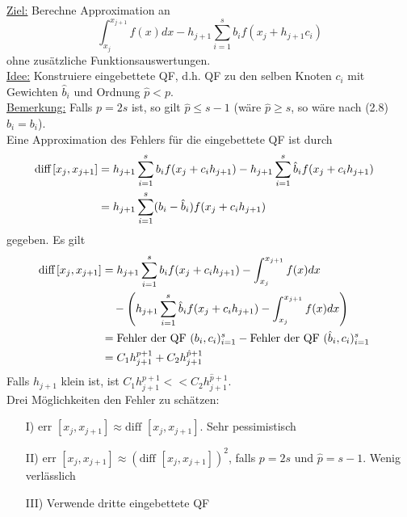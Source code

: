 \begin{nothing}
\underline{Ziel:} Berechne Approximation an 
$$\int_{x_j}^{x_{j+1}} f(x)dx - h_{j+1} \sum_{i=1}^s b_i f(x_j + h_{j+1} c_i)$$
ohne zusätzliche Funktionsauswertungen.\\
\underline{Idee:} Konstruiere eingebettete QF, d.h. QF zu den selben Knoten $c_i$ mit Gewichten $\hat{b}_i$ und Ordnung $\hat{p} < p$. \\
\underline{Bemerkung:} Falls $p=2s$ ist, so gilt $\hat{p} \leq s-1$ (wäre $\hat{p} \geq s$, so wäre nach (2.8) $\hat{b}_i = b_i$).\\
Eine Approximation des Fehlers für die eingebettete QF ist durch 
\begin{align*}
\text{diff} \thinspace [x_j, x_{j+1}] &= h_{j+1} \sum_{i=1}^s b_i f(x_j + c_i h_{j+1}) - h_{j+1} \sum_{i=1}^s \hat{b}_i f(x_j + c_i h_{j+1})&\\
&= h_{j+1} \sum_{i=1}^s (b_i - \hat{b}_i) f(x_j+c_i h_{j+1})
\end{align*}
gegeben. Es gilt
\begin{align*}
\text{diff} \thinspace [x_j, x_{j+1}] &= h_{j+1} \sum_{i=1}^s b_i f(x_j + c_i h_{j+1}) - \int_{x_j}^{x_{j+1}} f(x)dx &\\
& \quad - \left( h_{j+1} \sum_{i=1}^s \hat{b}_i f(x_j + c_i h_{j+1}) - \int_{x_j}^{x_{j+1}} f(x)dx \right)&\\
&= \text{Fehler der QF } (b_i, c_i)_{i=1}^s - \text{Fehler der QF } (\hat{b}_i, c_i)_{i=1}^s &\\
&= C_1 h_{j+1}^{p+1} + C_2h_{j+1}^{\hat{p}+1}
\end{align*}
Falls $h_{j+1}$ klein ist, ist $C_1 h_{j+1}^{p+1} << C_2h_{j+1}^{\hat{p}+1}$.\\
Drei Möglichkeiten den Fehler zu schätzen:
\begin{enumerate}
  \item[I)] $\text{err }[x_j, x_{j+1}] \approx \text{diff }[x_j, x_{j+1}]$. Sehr pessimistisch
  \item[II)] $\text{err }[x_j, x_{j+1}] \approx (\text{diff }[x_j, x_{j+1}])^2$, falls $p=2s$ und $\hat{p} = s-1$. Wenig verlässlich
  \item[III)] Verwende dritte eingebettete QF 
\end{enumerate}
\end{nothing}

